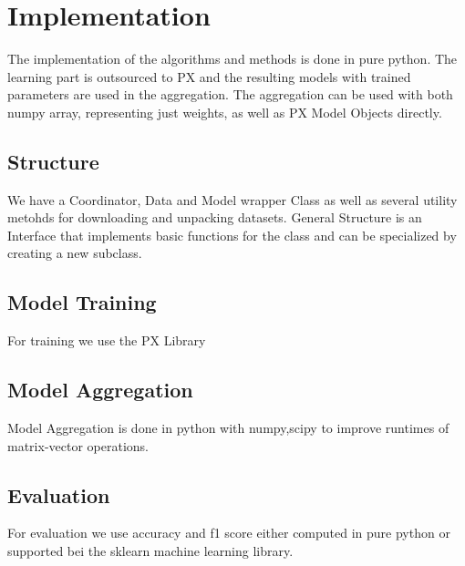 
\chapter{Implementation}
\label{chapter:ch4}

The implementation of the algorithms and methods is done in pure python.
The learning part is outsourced to PX and the resulting models with trained parameters are used in the aggregation.
The aggregation can be used with both numpy array, representing just weights, as well as PX Model Objects directly.

\section{Structure}
We have a Coordinator, Data and Model wrapper Class as well as several utility metohds for downloading and unpacking datasets.
General Structure is an Interface that implements basic functions for the class and can be specialized by creating a new subclass.
\section{Model Training}
For training we use the PX Library
\section{Model Aggregation}
Model Aggregation is done in python with numpy,scipy to improve runtimes of matrix-vector operations.
\section{Evaluation}
For evaluation we use accuracy and f1 score either computed in pure python or supported bei the sklearn machine learning library.